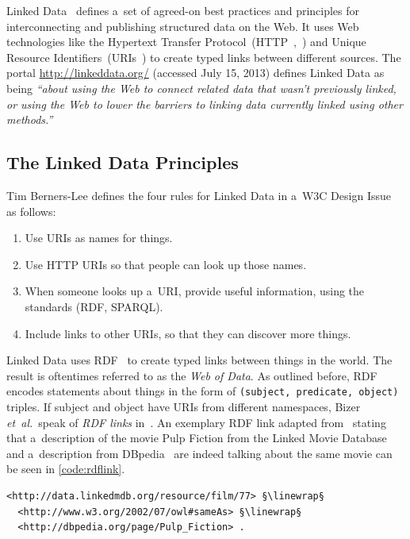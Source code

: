 Linked Data~\cite{bernerslee2006linkeddata}
defines a~set of agreed-on best practices and
principles for interconnecting and publishing
structured data on the Web.
It uses Web technologies like the Hypertext Transfer Protocol~(HTTP~,~\cite{fielding1999http})
and Unique Resource Identifiers~(URIs~\cite{bernerslee2005uri})
to create typed links between different sources.
The portal \url{http://linkeddata.org/} (accessed July 15, 2013)
defines Linked Data as being
\textit{``about using the Web to connect related data that
wasn’t previously linked, or using the Web
to lower the barriers to linking data
currently linked using other methods.''}

\subsection{The Linked Data Principles}
\label{sec:linked-data-principles}

Tim Berners-Lee defines the four rules for Linked Data in a~W3C Design Issue~\cite{bernerslee2006linkeddata} as follows:

\begin{enumerate}
  \item Use URIs as names for things.
  \item Use HTTP URIs so that people can look up those names.
  \item When someone looks up a~URI, provide useful information,
        using the standards (RDF, SPARQL).
  \item Include links to other URIs,
        so that they can discover more things.
\end{enumerate}

Linked Data uses RDF~\cite{klyne2004rdf} to create
typed links between things in the world.
The result is oftentimes referred to as the \emph{Web of Data}.
As outlined before, RDF encodes statements
about things in the form of
\texttt{(subject, predicate, object)} triples.
If subject and object have URIs from different namespaces,
Bizer \emph{et~al.}\ speak of \emph{RDF links}
in~\cite{heath2011linkeddata}.
An exemplary RDF link adapted from~\cite{bizer2009linkeddatastory}
stating that a~description of the movie Pulp Fiction
from the Linked Movie Database~\cite{hassanzadeh2009linkedmovie}
and a~description from DBpedia~\cite{auer2007dbpedia}
are indeed talking about the same movie
can be seen in \autoref{code:rdflink}.

\begin{lstlisting}[caption={[Exemplary RDF link]{Exemplary RDF
  link stating that a~description of the movie Pulp Fiction from
  the Linked Movie Database~\cite{hassanzadeh2009linkedmovie}
  and a~description from DBpedia are indeed talking
  about the same movie}},
  label={code:rdflink},
  escapechar=§]
<http://data.linkedmdb.org/resource/film/77> §\linewrap§
  <http://www.w3.org/2002/07/owl#sameAs> §\linewrap§
  <http://dbpedia.org/page/Pulp_Fiction> .
\end{lstlisting}

